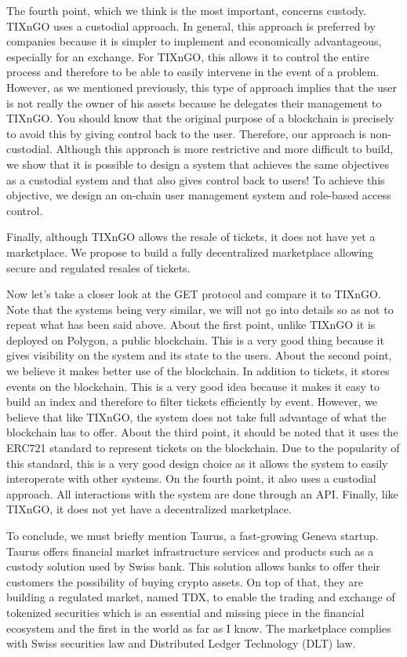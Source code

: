 \documentclass[a4paper,11pt,oneside]{report}
\begin{document}
The fourth point, which we think is the most important, concerns custody. TIXnGO uses a custodial approach. In general, this approach is preferred by companies because it is simpler to implement and economically advantageous, especially for an exchange. For TIXnGO, this allows it to control the entire process and therefore to be able to easily intervene in the event of a problem. However, as we mentioned previously, this type of approach implies that the user is not really the owner of his assets because he delegates their management to TIXnGO. You should know that the original purpose of a blockchain is precisely to avoid this by giving control back to the user. Therefore, our approach is non-custodial. Although this approach is more restrictive and more difficult to build, we show that it is possible to design a system that achieves the same objectives as a custodial system and that also gives control back to users! To achieve this objective, we design an on-chain user management system and role-based access control.

Finally, although TIXnGO allows the resale of tickets, it does not have yet a marketplace. We propose to build a fully decentralized marketplace allowing secure and regulated resales of tickets.

Now let's take a closer look at the GET protocol and compare it to TIXnGO. Note that the systems being very similar, we will not go into details so as not to repeat what has been said above. About the first point, unlike TIXnGO it is deployed on Polygon, a public blockchain. This is a very good thing because it gives visibility on the system and its state to the users. About the second point, we believe it makes better use of the blockchain. In addition to tickets, it stores events on the blockchain. This is a very good idea because it makes it easy to build an index and therefore to filter tickets efficiently by event. However, we believe that like TIXnGO, the system does not take full advantage of what the blockchain has to offer. About the third point, it should be noted that it uses the ERC721 standard to represent tickets on the blockchain. Due to the popularity of this standard, this is a very good design choice as it allows the system to easily interoperate with other systems. On the fourth point, it also uses a custodial approach. All interactions with the system are done through an API. Finally, like TIXnGO, it does not yet have a decentralized marketplace.

To conclude, we must briefly mention Taurus, a fast-growing Geneva startup. Taurus offers financial market infrastructure services and products such as a custody solution used by Swiss bank. This solution allows banks to offer their customers the possibility of buying crypto assets. On top of that, they are building a regulated market, named TDX, to enable the trading and exchange of tokenized securities which is an essential and missing piece in the financial ecosystem and the first in the world as far as I know. The marketplace complies with Swiss securities law and Distributed Ledger Technology (DLT) law.
\end{document}
